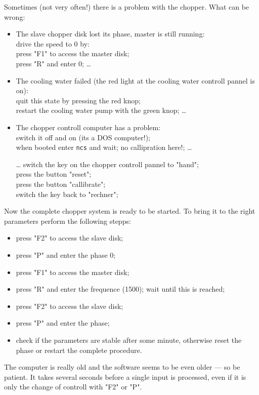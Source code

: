 \documentclass[10pt]{article}
\newcommand{\<}{$<$}
\renewcommand{\>}{\/$>$}
\begin{document}
Sometimes (not very often!) there is a problem with the chopper. 
What can be wrong:
           \begin{itemize}
 \item The slave chopper disk lost its phase, master is still running: \\
       drive the speed to 0 by: \\
       press "F1" to access the master disk; \\
       press "R" and enter 0; \dots
 \item The cooling water failed (the red light at the cooling water 
       controll pannel is on): \\
       quit this state by pressing the red knop; \\
       restart the cooling water pump with the green knop; \dots
 \item The chopper controll computer has a problem: \\
       switch it off and on (its a DOS computer!); \\
       when booted enter \texttt{ncs} and wait; 
       no callipration here!; \dots
 \item[\dots] 
       switch the key on the chopper controll pannel to "hand"; \\
       press the button "reset"; \\
       press the button "callibrate"; \\
       switch the key back to "rechner";  \\
          \end{itemize}
Now the complete chopper system is ready to be started. To bring it to the
right parameters perform the following stepps:
          \begin{itemize}
 \item press "F2" to access the slave disk;
 \item press "P" and enter the phase 0;
 \item press "F1" to access the master disk;
 \item press "R" and enter the frequence (1500);
       wait until this is reached;
 \item press "F2" to access the slave disk;
 \item press "P" and enter the phase;
 \item check if the parameters are stable after some minute,
       otherwise reset the phase or restart the complete 
       procedure.
           \end{itemize}
The computer is really old and the software seems to be even older --- 
so be patient. It takes several seconds before a single input is
processed, even if it is only the change of controll with "F2" or "P". \\
\end{document}
